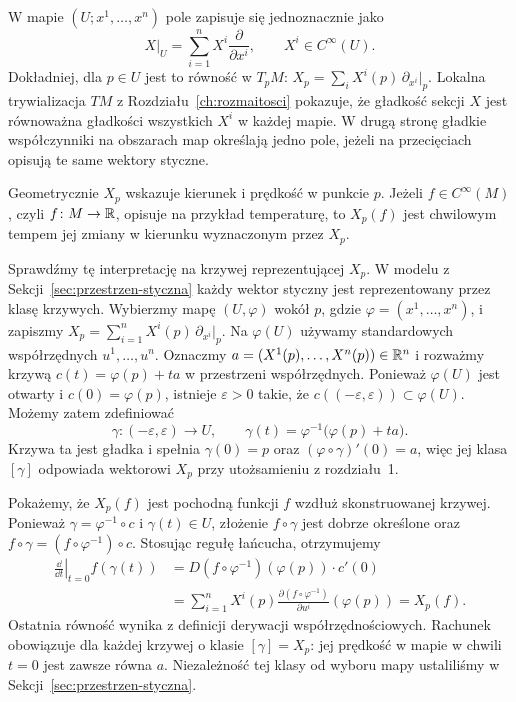 W mapie $(U;x^1,\ldots,x^n)$ pole zapisuje się jednoznacznie jako
\begin{equation}\label{eq:lokalne-pole}
 X\big|_U=\sum_{i=1}^{n}X^i\frac{\partial}{\partial x^i},
 \qquad X^i\in C^\infty(U).
\end{equation}
Dokładniej, dla $p\in U$ jest to równość w $T_pM$:
$X_p=\sum_iX^i(p)\,\partial_{x^i}|_p$.
Lokalna trywializacja $TM$ z Rozdziału~\ref{ch:rozmaitosci}
pokazuje, że gładkość sekcji $X$ jest równoważna gładkości
wszystkich $X^i$ w każdej mapie. W drugą stronę gładkie współczynniki
na obszarach map określają jedno pole, jeżeli na przecięciach
opisują te same wektory styczne.

Geometrycznie $X_p$ wskazuje kierunek i prędkość w punkcie $p$.
Jeżeli $f\in C^\infty(M)$, czyli $f\colon M\to\mathbb{R}$,
opisuje na przykład temperaturę, to $X_p(f)$ jest chwilowym
tempem jej zmiany w kierunku wyznaczonym przez $X_p$.

Sprawdźmy tę interpretację na krzywej reprezentującej $X_p$.
W modelu z Sekcji~\ref{sec:przestrzen-styczna} każdy wektor
styczny jest reprezentowany przez klasę krzywych.
Wybierzmy mapę $(U,\varphi)$ wokół $p$, gdzie
$\varphi=(x^1,\ldots,x^n)$, i zapiszmy
$X_p=\sum_{i=1}^n X^i(p)\,\partial_{x^i}|_p$.
Na $\varphi(U)$ używamy standardowych współrzędnych
$u^1,\ldots,u^n$.
Oznaczmy $a=(X^1(p),\ldots,X^n(p))\in\mathbb{R}^n$ i rozważmy
krzywą $c(t)=\varphi(p)+ta$ w przestrzeni współrzędnych.
Ponieważ $\varphi(U)$ jest otwarty i $c(0)=\varphi(p)$,
istnieje $\varepsilon>0$ takie, że
$c((-\varepsilon,\varepsilon))\subset\varphi(U)$.
Możemy zatem zdefiniować
\[
\gamma\colon(-\varepsilon,\varepsilon)\to U,
\qquad
\gamma(t)=\varphi^{-1}\bigl(\varphi(p)+ta\bigr).
\]
Krzywa ta jest gładka i spełnia $\gamma(0)=p$ oraz
$(\varphi\circ\gamma)'(0)=a$, więc jej klasa $[\gamma]$
odpowiada wektorowi $X_p$ przy utożsamieniu
z rozdziału~1.

Pokażemy, że $X_p(f)$ jest pochodną funkcji $f$
wzdłuż skonstruowanej krzywej. Ponieważ
$\gamma=\varphi^{-1}\circ c$ i $\gamma(t)\in U$,
złożenie $f\circ\gamma$ jest dobrze określone oraz
$f\circ\gamma=(f\circ\varphi^{-1})\circ c$.
Stosując regułę łańcucha, otrzymujemy
\[
\begin{aligned}
\left.\frac{\dd}{\dd t}\right|_{t=0}f(\gamma(t))
&=D(f\circ\varphi^{-1})(\varphi(p))\cdot c'(0)\\
&=\sum_{i=1}^n X^i(p)
  \frac{\partial(f\circ\varphi^{-1})}{\partial u^i}
  (\varphi(p))
=X_p(f).
\end{aligned}
\]
Ostatnia równość wynika z definicji derywacji
współrzędnościowych. Rachunek obowiązuje dla każdej krzywej
o klasie $[\gamma]=X_p$: jej prędkość w mapie w chwili $t=0$
jest zawsze równa $a$. Niezależność tej klasy od wyboru mapy
ustaliliśmy w Sekcji~\ref{sec:przestrzen-styczna}.

